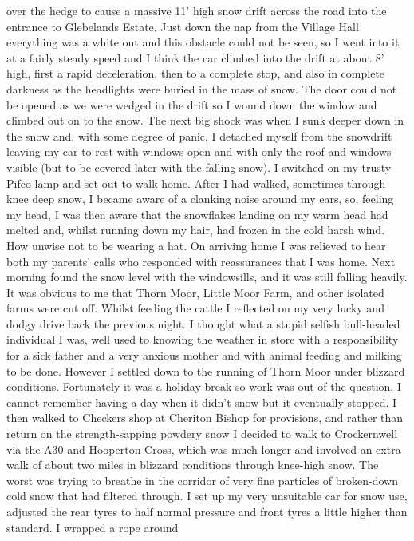 over the hedge to cause a massive 11' high snow drift across the road into the
entrance to Glebelands Estate. Just down the nap from the Village Hall
everything was a white out and this obstacle could not be seen, so I went into
it at a fairly steady speed and I think the car climbed into the drift at about
8' high, first a rapid deceleration, then to a complete stop, and also in
complete darkness as the headlights were buried in the mass of snow. The door
could not be opened as we were wedged in the drift so I wound down the window
and climbed out on to the snow. The next big shock was when I sunk deeper down
in the snow and, with some degree of panic, I detached myself from the
snowdrift leaving my car to rest with windows open and with only the roof and
windows visible (but to be covered later with the falling snow). I switched on
my trusty Pifco lamp and set out to walk home. After I had walked, sometimes
through knee deep snow, I became aware of a clanking noise around my ears, so,
feeling my head, I was then aware that the snowflakes landing on my warm head
had melted and, whilst running down my hair, had frozen in the cold harsh wind.
How unwise not to be wearing a hat. On arriving home I was relieved to hear
both my parents' calls who responded with reassurances that I was home. Next
morning found the snow level with the windowsills, and it was still falling
heavily. It was obvious to me that Thorn Moor, Little Moor Farm, and other
isolated farms were cut off. Whilst feeding the cattle I reflected on my very
lucky and dodgy drive back the previous night. I thought what a stupid selfish
bull-headed individual I was, well used to knowing the weather in store with a
responsibility for a sick father and a very anxious mother and with animal
feeding and milking to be done. However I settled down to the running of Thorn
Moor under blizzard conditions. Fortunately it was a holiday break so work was
out of the question. I cannot remember having a day when it didn't snow but it
eventually stopped. I then walked to Checkers shop at Cheriton Bishop for
provisions, and rather than return on the strength-sapping powdery snow I
decided to walk to Crockernwell via the A30 and Hooperton Cross, which was much
longer and involved an extra walk of about two miles in blizzard conditions
through knee-high snow. The worst was trying to breathe in the corridor of very
fine particles of broken-down cold snow that had filtered through. I set up my
very unsuitable car for snow use, adjusted the rear tyres to half normal
pressure and front tyres a little higher than standard. I wrapped a rope around
